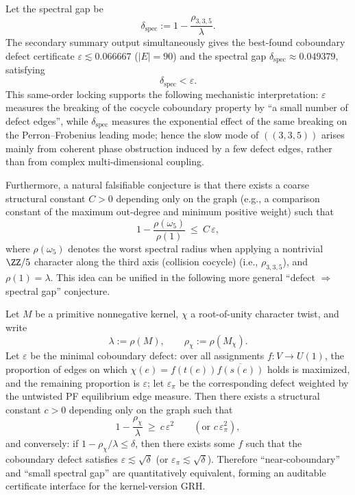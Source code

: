 \begin{remark}\label{rem:arity-335-eps-vs-gap}
Let the spectral gap be
$$
\delta_{\mathrm{spec}}:=1-\frac{\rho_{3,3,5}}{\lambda}.
$$
The secondary summary output simultaneously gives the best-found coboundary defect certificate \(\varepsilon\lesssim 0.066667\) (\(|E|=90\)) and the spectral gap
\(
\delta_{\mathrm{spec}}\approx 0.049379
\), satisfying
$$
\delta_{\mathrm{spec}}<\varepsilon.
$$
This same-order locking supports the following mechanistic interpretation: \(\varepsilon\) measures the breaking of the cocycle coboundary property by ``a small number of defect edges'', while \(\delta_{\mathrm{spec}}\) measures the exponential effect of the same breaking on the Perron--Frobenius leading mode; hence the slow mode of \(((3,3,5))\) arises mainly from coherent phase obstruction induced by a few defect edges, rather than from complex multi-dimensional coupling.

Furthermore, a natural falsifiable conjecture is that there exists a coarse structural constant \(C>0\) depending only on the graph (e.g., a comparison constant of the maximum out-degree and minimum positive weight) such that
$$
1-\frac{\rho(\omega_5)}{\rho(1)}\ \le\ C\,\varepsilon,
$$
where \(\rho(\omega_5)\) denotes the worst spectral radius when applying a nontrivial \(\ZZ/5\) character along the third axis (collision cocycle) (i.e., \(\rho_{3,3,5}\)), and \(\rho(1)=\lambda\). This idea can be unified in the following more general ``defect $\Rightarrow$ spectral gap'' conjecture.
\end{remark}



\begin{conjecture}\label{conj:coboundary-defect-gap}
Let $M$ be a primitive nonnegative kernel, $\chi$ a root-of-unity character twist, and write
$$
\lambda:=\rho(M),\qquad \rho_\chi:=\rho(M_\chi).
$$
Let \(\varepsilon\) be the minimal coboundary defect: over all assignments \(f:V\to U(1)\), the proportion of edges on which
\(
\chi(e)=f(t(e))\overline{f(s(e))}
\)
holds is maximized, and the remaining proportion is \(\varepsilon\); let \(\varepsilon_\pi\) be the corresponding defect weighted by the untwisted PF equilibrium edge measure. Then there exists a structural constant \(c>0\) depending only on the graph such that
$$
1-\frac{\rho_\chi}{\lambda}\ \ge\ c\,\varepsilon^2
\qquad(\text{or }c\,\varepsilon_\pi^2),
$$
and conversely: if \(1-\rho_\chi/\lambda\le \delta\), then there exists some \(f\) such that the coboundary defect satisfies \(\varepsilon\lesssim \sqrt{\delta}\) (or \(\varepsilon_\pi\lesssim \sqrt{\delta}\)). Therefore ``near-coboundary'' and ``small spectral gap'' are quantitatively equivalent, forming an auditable certificate interface for the kernel-version GRH.
\end{conjecture}

